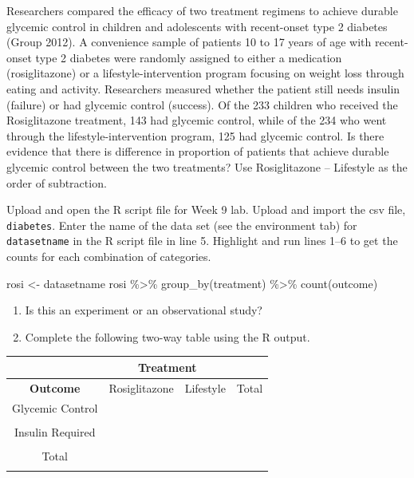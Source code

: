 \documentclass[
]{report}
\newenvironment{Shaded}{\begin{snugshade}}{\end{snugshade}}
\newcommand{\FunctionTok}[1]{\textcolor[rgb]{0.00,0.00,0.00}{#1}}
\newcommand{\NormalTok}[1]{#1}
\newcommand{\OtherTok}[1]{\textcolor[rgb]{0.56,0.35,0.01}{#1}}
\newcommand{\SpecialCharTok}[1]{\textcolor[rgb]{0.00,0.00,0.00}{#1}}
\begin{document}
Researchers compared the efficacy of two treatment regimens to achieve durable glycemic control in children and adolescents with recent-onset type 2 diabetes (Group 2012). A convenience sample of patients 10 to 17 years of age with recent-onset type 2 diabetes were randomly assigned to either a medication (rosiglitazone) or a lifestyle-intervention program focusing on weight loss through eating and activity. Researchers measured whether the patient still needs insulin (failure) or had glycemic control (success). Of the 233 children who received the Rosiglitazone treatment, 143 had glycemic control, while of the 234 who went through the lifestyle-intervention program, 125 had glycemic control. Is there evidence that there is difference in proportion of patients that achieve durable glycemic control between the two treatments? Use Rosiglitazone -- Lifestyle as the order of subtraction.

Upload and open the R script file for Week 9 lab. Upload and import the csv file, \texttt{diabetes}. Enter the name of the data set (see the environment tab) for \texttt{datasetname} in the R script file in line 5. Highlight and run lines 1--6 to get the counts for each combination of categories.

\begin{Shaded}
\begin{Highlighting}[]
\NormalTok{rosi }\OtherTok{\textless{}{-}}\NormalTok{ datasetname}
\NormalTok{rosi }\SpecialCharTok{\%\textgreater{}\%} \FunctionTok{group\_by}\NormalTok{(treatment) }\SpecialCharTok{\%\textgreater{}\%} \FunctionTok{count}\NormalTok{(outcome)}
\end{Highlighting}
\end{Shaded}

\begin{enumerate}
\def\labelenumi{\arabic{enumi}.}
\item
  Is this an experiment or an observational study?
  \vspace{0.2in}
\item
  Complete the following two-way table using the R output.
\end{enumerate}

\begin{center}
\begin{tabular}{|c|c|c|c|}\hline
 & \multicolumn{2}{|c|}{\textbf{Treatment}} & \\ \hline
\textbf{Outcome} & Rosiglitazone & Lifestyle & Total \\ \hline
 Glycemic Control & & & \\ 
 & & & \\ \hline
 Insulin Required & & & \\ 
 & & & \\ \hline
 Total & & &  \\ 
 & & & \\ \hline  
\end{tabular}
\end{center}
\end{document}

